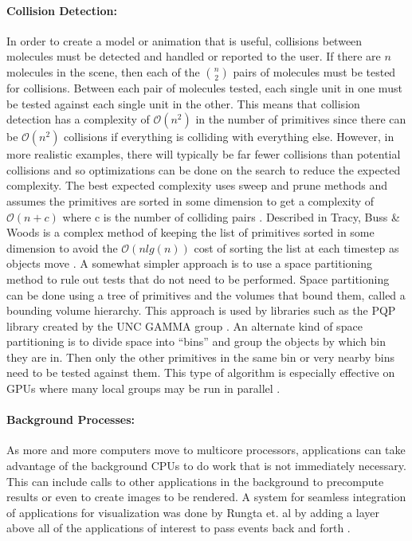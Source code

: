 \documentclass[twocolumn]{bmcart}%
\begin{document}
\paragraph*{Collision Detection:}
In order to create a model or animation that is useful, collisions between molecules must be detected and handled or reported to the user.  If there are $n$ molecules in the scene, then each of the $n\choose 2$ pairs of molecules must be tested for collisions.  Between each pair of molecules tested, each single unit in one must be tested against each single unit in the other.  This means that collision detection has a complexity of $\mathcal{O}(n^2)$ in the number of primitives since there can be $\mathcal{O}(n^2)$ collisions if everything is colliding with everything else.  However, in more realistic examples, there will typically be far fewer collisions than potential collisions and so optimizations can be done on the search to reduce the expected complexity.  The best expected complexity uses sweep and prune methods and assumes the primitives are sorted in some dimension to get a complexity of $\mathcal{O}(n + c)$ where c is the number of colliding pairs \cite{tracy2009efficient}.  Described in Tracy, Buss \& Woods is a complex method of keeping the list of primitives sorted in some dimension to avoid the $\mathcal{O}(n lg(n))$ cost of sorting the list at each timestep as objects move \cite{tracy2009efficient}.  A somewhat simpler approach is to use a space partitioning method to rule out tests that do not need to be performed.  Space partitioning can be done using a tree of primitives and the volumes that bound them, called a bounding volume hierarchy.  This approach is used by libraries such as the PQP library created by the UNC GAMMA group \cite{PQP}.  An alternate kind of space partitioning is to divide space into “bins” and group the objects by which bin they are in.  Then only the other primitives in the same bin or very nearby bins need to be tested against them.  This type of algorithm is especially effective on GPUs where many local groups may be run in parallel \cite{oat2008efficient}.

\paragraph*{Background Processes: }
As more and more computers move to multicore processors, applications can take advantage of the background CPUs to do work that is not immediately necessary.  This can include calls to other applications in the background to precompute results or even to create images to be rendered.  A system for seamless integration of applications for visualization was done by Rungta et. al by adding a layer above all of the applications of interest to pass events back and forth \cite{rungta2013manyvis}.
\end{document}
